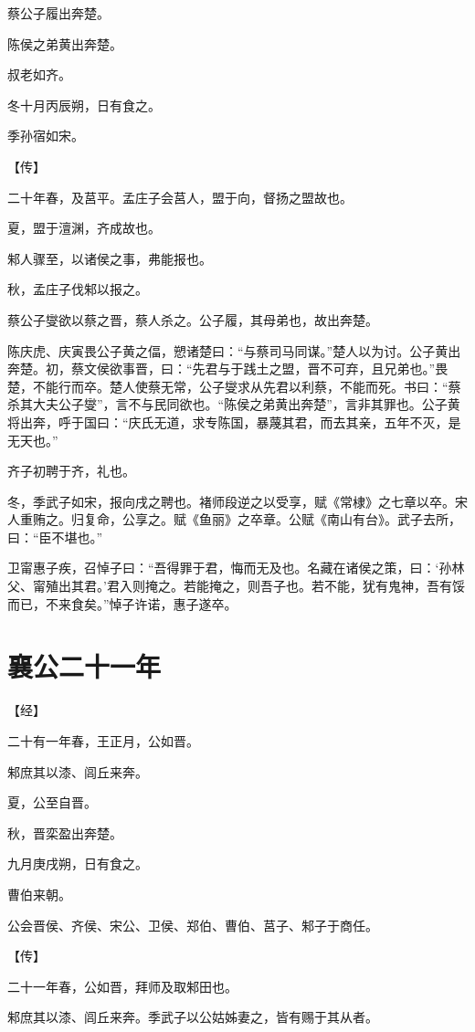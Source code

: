 \documentclass[a4paper,12pt,UTF8,twoside]{ctexbook}
\begin{document}
蔡公子履出奔楚。

陈侯之弟黄出奔楚。

叔老如齐。

冬十月丙辰朔，日有食之。

季孙宿如宋。

【传】

二十年春，及莒平。孟庄子会莒人，盟于向，督扬之盟故也。

夏，盟于澶渊，齐成故也。

邾人骤至，以诸侯之事，弗能报也。

秋，孟庄子伐邾以报之。

蔡公子燮欲以蔡之晋，蔡人杀之。公子履，其母弟也，故出奔楚。

陈庆虎、庆寅畏公子黄之偪，愬诸楚曰：“与蔡司马同谋。”楚人以为讨。公子黄出奔楚。初，蔡文侯欲事晋，曰：“先君与于践土之盟，晋不可弃，且兄弟也。”畏楚，不能行而卒。楚人使蔡无常，公子燮求从先君以利蔡，不能而死。书曰：“蔡杀其大夫公子燮”，言不与民同欲也。“陈侯之弟黄出奔楚”，言非其罪也。公子黄将出奔，呼于国曰：“庆氏无道，求专陈国，暴蔑其君，而去其亲，五年不灭，是无天也。”

齐子初聘于齐，礼也。

冬，季武子如宋，报向戌之聘也。褚师段逆之以受享，赋《常棣》之七章以卒。宋人重贿之。归复命，公享之。赋《鱼丽》之卒章。公赋《南山有台》。武子去所，曰：“臣不堪也。”

卫甯惠子疾，召悼子曰：“吾得罪于君，悔而无及也。名藏在诸侯之策，曰：‘孙林父、甯殖出其君。’君入则掩之。若能掩之，则吾子也。若不能，犹有鬼神，吾有馁而已，不来食矣。”悼子许诺，惠子遂卒。


\chapter{襄公二十一年}


【经】

二十有一年春，王正月，公如晋。

邾庶其以漆、闾丘来奔。

夏，公至自晋。

秋，晋栾盈出奔楚。

九月庚戌朔，日有食之。

曹伯来朝。

公会晋侯、齐侯、宋公、卫侯、郑伯、曹伯、莒子、邾子于商任。

【传】

二十一年春，公如晋，拜师及取邾田也。

邾庶其以漆、闾丘来奔。季武子以公姑姊妻之，皆有赐于其从者。
\end{document}
